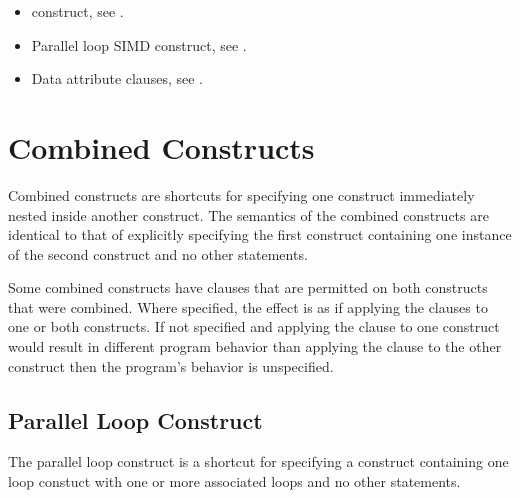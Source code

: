 {{{{\crossreferences
\begin{itemize}
\item {} construct, see 
.

\item Parallel loop SIMD construct, see 
.

\item Data attribute clauses, see .
\end{itemize}





%
%
\section{Combined Constructs}
\label{sec:Combined Constructs}
Combined constructs are shortcuts for specifying one construct immediately nested 
inside another construct. The semantics of the combined constructs are identical to that 
of explicitly specifying the first construct containing one instance of the second 
construct and no other statements.

Some combined constructs have clauses that are permitted on both constructs that were
combined. Where specified, the effect is as if applying the clauses to one or both
constructs. If not specified and applying the clause to one construct would result in
different program behavior than applying the clause to the other construct then the
program's behavior is unspecified.











\subsection{Parallel Loop Construct}
\label{subsec:Parallel Loop Construct}
\summary
The parallel loop construct is a shortcut for specifying a  construct
containing one loop constuct with one or more associated loops and no other statements.

}}}}
